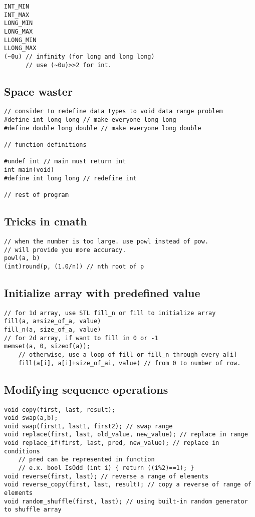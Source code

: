 \documentclass[a4paper]{article}
\begin{document}
\begin{verbatim}
INT_MIN
INT_MAX
LONG_MIN
LONG_MAX
LLONG_MIN
LLONG_MAX
(~0u) // infinity (for long and long long)
      // use (~0u)>>2 for int.
\end{verbatim}

\subsection{Space waster}

\begin{verbatim}
// consider to redefine data types to void data range problem
#define int long long // make everyone long long
#define double long double // make everyone long double

// function definitions

#undef int // main must return int
int main(void)
#define int long long // redefine int

// rest of program
\end{verbatim}

\subsection{Tricks in cmath}
\begin{verbatim}
// when the number is too large. use powl instead of pow.
// will provide you more accuracy.
powl(a, b)
(int)round(p, (1.0/n)) // nth root of p
\end{verbatim}

\subsection{Initialize array with predefined value}
\begin{verbatim}
// for 1d array, use STL fill_n or fill to initialize array
fill(a, a+size_of_a, value)
fill_n(a, size_of_a, value)
// for 2d array, if want to fill in 0 or -1
memset(a, 0, sizeof(a));
	// otherwise, use a loop of fill or fill_n through every a[i]
	fill(a[i], a[i]+size_of_ai, value) // from 0 to number of row.
\end{verbatim}

\subsection{Modifying sequence operations}

\begin{verbatim}
void copy(first, last, result);
void swap(a,b);
void swap(first1, last1, first2); // swap range
void replace(first, last, old_value, new_value); // replace in range
void replace_if(first, last, pred, new_value); // replace in conditions
	// pred can be represented in function
	// e.x. bool IsOdd (int i) { return ((i%2)==1); }
void reverse(first, last); // reverse a range of elements
void reverse_copy(first, last, result); // copy a reverse of range of elements
void random_shuffle(first, last); // using built-in random generator to shuffle array
\end{verbatim}
\end{document}
